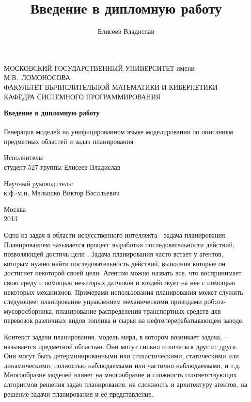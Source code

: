 \documentclass[a4paper,14pt]{extreport}
\title{Введение в дипломную работу}
\author{Елисеев Владислав}
\begin{document}
\begin{titlepage}

\begin{center}
{\small
МОСКОВСКИЙ ГОСУДАРСТВЕННЫЙ УНИВЕРСИТЕТ имени М.В.~ЛОМОНОСОВА \\
ФАКУЛЬТЕТ ВЫЧИСЛИТЕЛЬНОЙ МАТЕМАТИКИ И КИБЕРНЕТИКИ \\
КАФЕДРА СИСТЕМНОГО ПРОГРАММИРОВАНИЯ
}
\end{center}

\vfill
\vfill
\begin{center}
\Large{\textbf{Введение в дипломную работу}} \\
~\\
\Large{Генерация моделей на унифицированном языке моделирования по описаниям предметных областей и задач планирования}
\end{center}
\vfill
\vfill
\vfill
\vfill
\begin{flushright}
Исполнитель: \\
студент 527 группы Елисеев Владислав
\end{flushright}
\vfill
\begin{flushright}
Научный руководитель: \\
к.ф.-м.н. Малышко Виктор Васильевич
\end{flushright}
  
\vfill
\vfill
\vfill
\vfill
\begin{center}
  Москва\\
  2013
\end{center}  
\end{titlepage}

\setcounter{page}{1}
\linespread{1.25}
\normalsize

	Одна из задач в области искусственного интеллекта - задача планирования. Планированием называется процесс выработки последовательности действий, позволяющей достичь цели \cite{norwig-ai}. Задача планирования часто встает у агентов, которым нужно найти последовательность действий, выполнив которые он достигнет некоторой своей цели. Агентом можно назвать все, что воспринимает свою среду с помощью некоторых датчиков и воздействует на нее с помощью некоторых механизмов. Примерами использования планирования может служить следующее: планирование управлением механическими приводами робота-мусоросборника, планирование распределения транспортных средств для перевозок различных видов топлива и сырья на нефтеперерабатывающем заводе. 


	Контекст задачи планирования, модель мира, в котором возникает задача, -- называется предметной областью. Они могут сильно отличаться друг от друга. Они могут быть детерминированными или стохастическими, статическими или динамическими, полностью наблюдаемыми или частично наблюдаемыми, и т.д. Многообразие моделей влияет на многообразие и сложность соответствующих алгоритмов решения задач планирования, на сложность и архитектуру агентов, на решение задачи планирования и её представление. 
	
\end{document}
